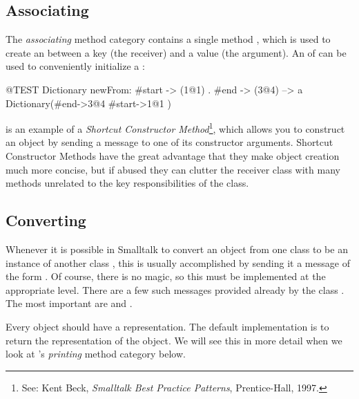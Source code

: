 \documentclass[a4paper,10pt,twoside]{book}
\begin{document}
	\renewcommand{\nnbb}[2]{} %
	\sloppy
\fi

\subsection{Associating}
The \emph{associating} method category contains a single method \ct{->}, which is used to create an  between a key (the receiver) and a value (the argument). An  of  can be used to conveniently initialize a :

\begin{code}{@TEST}
Dictionary newFrom: { #start -> (1@1) . #end -> (3@4) } --> a Dictionary(#end->3@4 #start->1@1 )
\end{code}

 is an example of a \emph{Shortcut Constructor Method}\footnote{See: Kent Beck, \emph{Smalltalk Best Practice Patterns}, Prentice-Hall, 1997.}, which allows you to construct an object by sending a message to one of its constructor arguments. Shortcut Constructor Methods have the great advantage that they make object creation much more concise, but if abused they can clutter the receiver class with many methods unrelated to the key responsibilities of the class.

\subsection{Converting}

Whenever it is possible in Smalltalk to convert an object from one class  to be an instance of another class , this is usually accomplished by sending it a message of the form . Of course, there is no magic, so this must be implemented at the appropriate level. There are a few such messages provided already by the class . The most important are  and .

Every object should have a  representation. The default implementation is to return the  representation of the object. We will see this in more detail when we look at 's \emph{printing} method category below.
\end{document}
